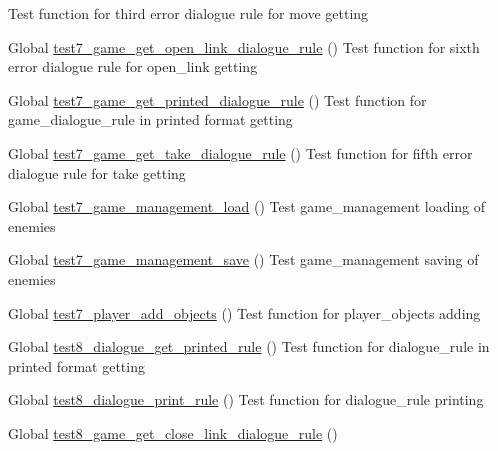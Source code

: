 \begin{DoxyRefList}
Test function for third error dialogue rule for move getting  
\item[Global \mbox{\hyperlink{game__test_8c_a7733f3ca882e59a4e20cdc83bf46c817}{test7\+\_\+game\+\_\+get\+\_\+open\+\_\+link\+\_\+dialogue\+\_\+rule}} ()]\label{test__test000373}%
%
Test function for sixth error dialogue rule for open\+\_\+link getting  
\item[Global \mbox{\hyperlink{game__test_8c_a2c7572cb79a97719e5d798fc74e89d0e}{test7\+\_\+game\+\_\+get\+\_\+printed\+\_\+dialogue\+\_\+rule}} ()]\label{test__test000317}%
%
Test function for game\+\_\+dialogue\+\_\+rule in printed format getting  
\item[Global \mbox{\hyperlink{game__test_8c_a077f0930d4133330f15bfba5bd3cfc0b}{test7\+\_\+game\+\_\+get\+\_\+take\+\_\+dialogue\+\_\+rule}} ()]\label{test__test000341}%
%
Test function for fifth error dialogue rule for take getting  
\item[Global \mbox{\hyperlink{game__management__test_8c_ade783358b83dac227d998c14862961a9}{test7\+\_\+game\+\_\+management\+\_\+load}} ()]\label{test__test000115}%
%
Test game\+\_\+management loading of enemies  
\item[Global \mbox{\hyperlink{game__management__test_8c_ae74941569f9df99b0e435f18e805a825}{test7\+\_\+game\+\_\+management\+\_\+save}} ()]\label{test__test000129}%
%
Test game\+\_\+management saving of enemies  
\item[Global \mbox{\hyperlink{player__test_8c_a37e5d4015e6929cc193ac1167c19a305}{test7\+\_\+player\+\_\+add\+\_\+objects}} ()]\label{test__test000562}%
%
Test function for player\+\_\+objects adding  
\item[Global \mbox{\hyperlink{dialogue__test_8c_af7fb65af1016049ea732c66b17792a18}{test8\+\_\+dialogue\+\_\+get\+\_\+printed\+\_\+rule}} ()]\label{test__test000074}%
%
Test function for dialogue\+\_\+rule in printed format getting  
\item[Global \mbox{\hyperlink{dialogue__test_8c_ae80db6c409c7f7bd7e359614600108ed}{test8\+\_\+dialogue\+\_\+print\+\_\+rule}} ()]\label{test__test000064}%
%
Test function for dialogue\+\_\+rule printing  
\item[Global \mbox{\hyperlink{game__test_8c_aab35c6dc58a1cc721da7230892ae6364}{test8\+\_\+game\+\_\+get\+\_\+close\+\_\+link\+\_\+dialogue\+\_\+rule}} ()]\label{test__test000384}%

\end{DoxyRefList}
